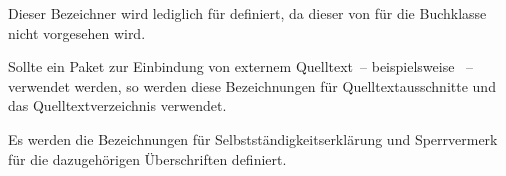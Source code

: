 \documentclass[%
  english,ngerman,%
  headings=optiontoheadandtoc,captions=tableheading,numbers=noenddot,%
  chapterpage,cdfoot,%
]{tudscrman}
\begin{document}
\begin{Declaration}{}
\printdeclarationlist%
%
Dieser Bezeichner wird lediglich für  definiert, da dieser von 
\KOMAScript{} für die Buchklasse nicht vorgesehen wird.
\end{Declaration}

\begin{Declaration}{}
\begin{Declaration}{}
\printdeclarationlist%
%
Sollte ein Paket zur Einbindung von externem Quelltext~-- beispielsweise 
~-- verwendet werden, so werden diese Bezeichnungen für 
Quelltextausschnitte und das Quelltextverzeichnis verwendet.
\end{Declaration}
\end{Declaration}

\begin{Declaration}{}
\begin{Declaration}{}
\printdeclarationlist%
%
%
Es werden die Bezeichnungen für Selbstständigkeitserklärung und Sperrvermerk für 
die dazugehörigen Überschriften definiert.
\end{Declaration}
\end{Declaration}
\end{document}
